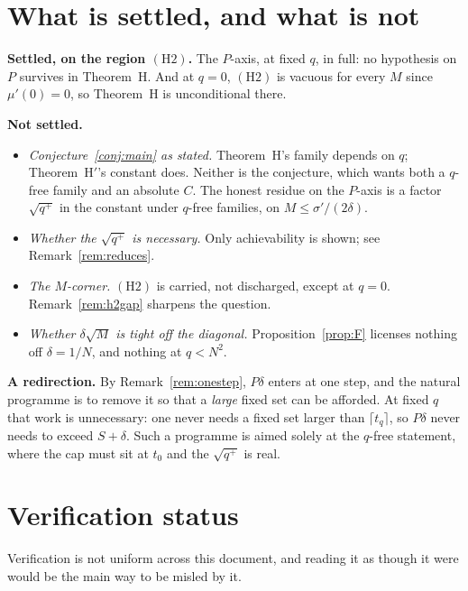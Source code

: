 \documentclass{aicr-solution}
\begin{document}
\section{What is settled, and what is not}\label{sec:open}

\noindent\textbf{Settled, on the region $(\mathrm{H2})$.} The $P$-axis, at fixed
$q$, in full: no hypothesis on $P$ survives in Theorem~H. And at $q = 0$,
$(\mathrm{H2})$ is vacuous for every $M$ since $\mu'(0) = 0$, so Theorem~H is
unconditional there.

\smallskip
\noindent\textbf{Not settled.}
\begin{itemize}[leftmargin=1.2em,itemsep=2pt]
\item \emph{Conjecture~\ref{conj:main} as stated.} Theorem~H's family depends on
  $q$; Theorem~H$'$'s constant does. Neither is the conjecture, which wants both a
  $q$-free family and an absolute $C$. The honest residue on the $P$-axis is a
  factor $\sqrt{q^{+}}$ in the constant under $q$-free families, on
  $M \le \sigma'/(2\delta)$.
\item \emph{Whether the $\sqrt{q^{+}}$ is necessary.} Only achievability is shown;
  see Remark~\ref{rem:reduces}.
\item \emph{The $M$-corner.} $(\mathrm{H2})$ is carried, not discharged, except at
  $q = 0$. Remark~\ref{rem:h2gap} sharpens the question.
\item \emph{Whether $\delta\sqrt{M}$ is tight off the diagonal.}
  Proposition~\ref{prop:F} licenses nothing off $\delta = 1/N$, and nothing at
  $q < N^{2}$.
\end{itemize}

\smallskip
\noindent\textbf{A redirection.} By Remark~\ref{rem:onestep}, $P\delta$ enters at
one step, and the natural programme is to remove it so that a \emph{large} fixed
set can be afforded. At fixed $q$ that work is unnecessary: one never needs a fixed
set larger than $\lceil t_q \rceil$, so $P\delta$ never needs to exceed
$S + \delta$. Such a programme is aimed solely at the $q$-free statement, where the
cap must sit at $t_0$ and the $\sqrt{q^{+}}$ is real.

\section{Verification status}\label{sec:verification}

\noindent Verification is not uniform across this document, and reading it as
though it were would be the main way to be misled by it.
\end{document}
